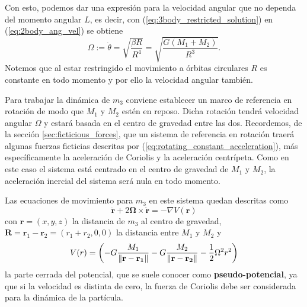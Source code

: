 Con esto, podemos dar una expresión para la velocidad angular que no dependa del momento angular $L$, es decir, con (\ref{eq:3body_restricted_solution}) en (\ref{eq:2body_ang_vel}) se obtiene
\begin{equation}
 \Omega := \dot{\theta} = \sqrt{ \frac{\beta R}{R^4} } = \sqrt{\frac{G \left(M_1 + M_2 \right)}{R^3}}.
 \label{eq:3body_ang_velocity}
\end{equation}
Notemos que al estar restringido el movimiento a órbitas circulares $R$ es constante en todo momento y por ello la velocidad angular también.

Para trabajar la dinámica de $m_3$ conviene establecer un marco de referencia en rotación de modo que $M_1$ y $M_2$ estén en reposo. Dicha rotación tendrá velocidad angular $\Omega$ y estará basada en el centro de gravedad entre las dos. Recordemos, de la sección \ref{sec:ficticious_forces}, que un sistema de referencia en rotación traerá algunas fuerzas ficticias descritas por (\ref{eq:rotating_constant_acceleration}), más específicamente la aceleración de Coriolis y la aceleración centrípeta. Como en este caso el sistema está centrado en el centro de gravedad de $M_1$ y $M_2$, la aceleración inercial del sistema será nula en todo momento.

Las ecuaciones de movimiento para $m_3$ en este sistema quedan descritas como
\begin{equation}
 \ddot{\mathbf{r}} + 2\mathbf{\Omega} \times \dot{\mathbf{r}} = - \nabla V(\mathbf{r})
 \label{eq:3body_restricted_acceleration}
\end{equation}
con $\mathbf{r} = (x,y,z)$ la distancia de $m_3$ al centro de gravedad, $\mathbf{R} = \mathbf{r}_1 - \mathbf{r}_2 = (r_1 + r_2,0,0)$ la distancia entre $M_1$ y $M_2$ y
\begin{equation}
 V(r) = \left( -G \frac{M_1}{\left\lVert\mathbf{r}-\mathbf{r_1}\right\rVert} - G \frac{M_2}{\left\lVert\mathbf{r}-\mathbf{r_2}\right\rVert} - \frac{1}{2} \Omega^2 r^2 \right)
 \label{eq:3body_restricted_potential}
\end{equation} 
la parte cerrada del potencial, que se suele conocer como \textbf{pseudo-potencial}, ya que si la velocidad es distinta de cero, la fuerza de Coriolis debe ser considerada para la dinámica de la partícula.

